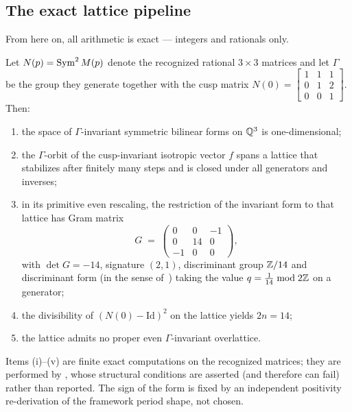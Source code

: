 \subsection{The exact lattice pipeline}

From here on, all arithmetic is exact --- integers and rationals only.

\begin{proposition}\label{prop:lattice}
Let $N(p) = \operatorname{Sym}^2 M(p)$ denote the recognized rational $3\times3$ matrices
and let $\Gamma$ be the group they generate together with the cusp matrix
$N(0) = \left[\begin{smallmatrix}1&1&1\\0&1&2\\0&0&1\end{smallmatrix}\right]$.
Then:
\begin{enumerate}
\item the space of $\Gamma$-invariant symmetric bilinear forms on $\mathbb{Q}^3$ is
  one-dimensional;
\item the $\Gamma$-orbit of the cusp-invariant isotropic vector $f$ spans a
  lattice that stabilizes after finitely many steps and is closed under all
  generators and inverses;
\item in its primitive even rescaling, the restriction of the invariant form
  to that lattice has Gram matrix
  \[
    G \;=\;
    \begin{pmatrix} 0&0&-1\\ 0&14&0\\ -1&0&0 \end{pmatrix},
  \]
  with $\det G = -14$, signature $(2,1)$, discriminant group $\mathbb{Z}/14$ and
  discriminant form (in the sense of~\cite{Nikulin1979}) taking the value
  $q = \tfrac{1}{14} \bmod 2\mathbb{Z}$ on a generator;
\item the divisibility of $(N(0)-\mathrm{Id})^2$ on the lattice yields
  $2n = 14$;
\item the lattice admits no proper even $\Gamma$-invariant overlattice.
\end{enumerate}
\end{proposition}

Items (i)--(v) are finite exact computations on the recognized matrices; they
are performed by , whose structural conditions
are asserted (and therefore can fail) rather than reported. The sign of the
form is fixed by an independent positivity re-derivation of the framework
period shape, not chosen.

